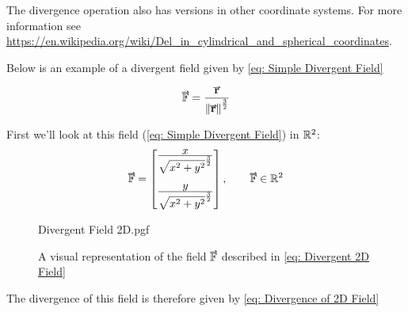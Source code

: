 \documentclass[main.tex]{subfiles}
\begin{document}
                    The divergence operation also has versions in other coordinate systems. For more information see \url{https://en.wikipedia.org/wiki/Del_in_cylindrical_and_spherical_coordinates}.



                    \vspace{2em}
                    Below is an example of a divergent field given by \eqref{eq: Simple Divergent Field}

                    \begin{equation}
                        \vect{\mathbb{F}} = \frac{\vect{r}}{\vmod{\vect{r}}^\frac{3}{2}}
                        \label{eq: Simple Divergent Field}
                    \end{equation}
                    

                    \newpage
                    First we'll look at this field (\eqref{eq: Simple Divergent Field}) in $\mathbb{R}^2$:
                    \begin{equation}
                        \vect{\mathbb{F}} = \Matrix{\bfrac{x}{\sqrt{x^2 + y^2}^\frac{3}{2}}\\[2em] \bfrac{y}{\sqrt{x^2 + y^2}^\frac{3}{2}}}, \hspace{2em} \vect{\mathbb{F}} \in \Reals^2
                        \label{eq: Divergent 2D Field}
                    \end{equation}


                    \begin{figure}[h]
                        \centering
                        \scalebox{0.85}
                        {
                            \begin{adjustbox}{clip,trim=15mm 15mm 15mm 15mm}
                                {{Divergent Field 2D.pgf}}
                            \end{adjustbox}
                        }
                        \caption{A visual representation of the field $\protect\vect{\mathbb{F}}$ described in \eqref{eq: Divergent 2D Field}}
                        \label{fig: Divergent 2D Field}
                    \end{figure}
                    \FloatBarrier
                    \vspace{2em}

                    The divergence of this field is therefore given by \eqref{eq: Divergence of 2D Field}
\end{document}
